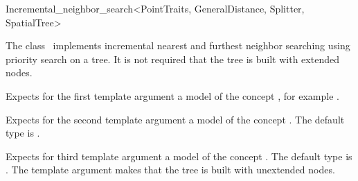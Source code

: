 

\begin{ccRefClass}{Incremental_neighbor_search<PointTraits, GeneralDistance, Splitter, SpatialTree>}


\ccDefinition

The class \ccRefName\ implements incremental nearest and furthest neighbor searching
using priority search on a tree. It is not required that the tree is
built with extended nodes.


\ccParameters

Expects for the first template argument a model of the concept ,
for example .

Expects for the second template argument a model of the
concept . The default type is 
.


Expects for third template argument a model of the concept .
The default type is . The 
template argument  makes that the tree is built with unextended nodes.

\ccTypes






\end{ccRefClass}

